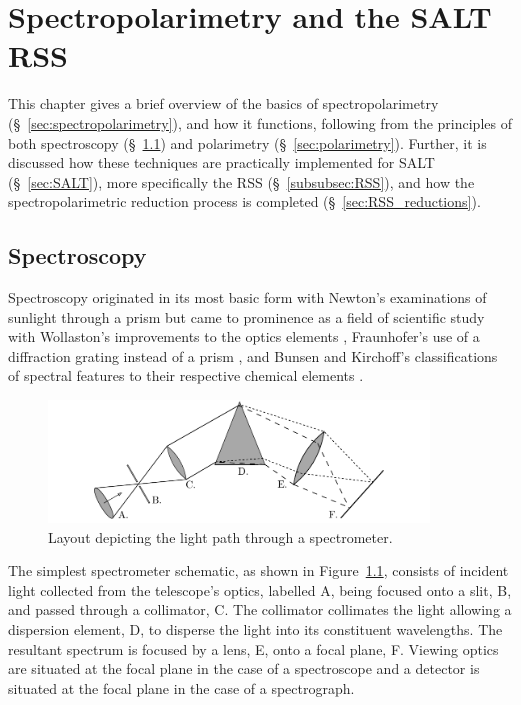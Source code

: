 \chapter{Spectropolarimetry and the SALT RSS}

This chapter gives a brief overview of the basics of spectropolarimetry (\S~\ref{sec:spectropolarimetry}), and how it functions, following from the principles of both spectroscopy (\S~\ref{sec:spectroscopy}) and polarimetry (\S~\ref{sec:polarimetry}). Further, it is discussed how these techniques are practically implemented for \gls{SALT} (\S~\ref{sec:SALT}), more specifically the \gls{RSS} (\S~\ref{subsubsec:RSS}), and how the spectropolarimetric reduction process is completed (\S~\ref{sec:RSS_reductions}).

\section{Spectroscopy}\label{sec:spectroscopy}

Spectroscopy originated in its most basic form with Newton's examinations of sunlight through a prism \citep{opticks} but came to prominence as a field of scientific study with Wollaston's improvements to the optics elements \citep{WollPrism}, Fraunhofer's use of a diffraction grating instead of a prism \citep{FraunGrating}, and Bunsen and Kirchoff's classifications of spectral features to their respective chemical elements \citep{KirBunSpec}.
\prgph

\begin{figure}[t]
  \centering
  \includegraphics[width = 0.9\textwidth]{figures/2_spectrometer.pdf}
  \caption{Layout depicting the light path through a spectrometer.}
  \label{fig:spectrometer}
\end{figure}

The simplest spectrometer schematic, as shown in Figure~\ref{fig:spectrometer}, consists of incident light collected from the telescope's optics, labelled A, being focused onto a slit, B, and passed through a collimator, C. The collimator collimates the light allowing a dispersion element, D, to disperse the light into its constituent wavelengths. The resultant spectrum is focused by a lens, E, onto a focal plane, F. Viewing optics are situated at the focal plane in the case of a spectroscope and a detector is situated at the focal plane in the case of a spectrograph.


